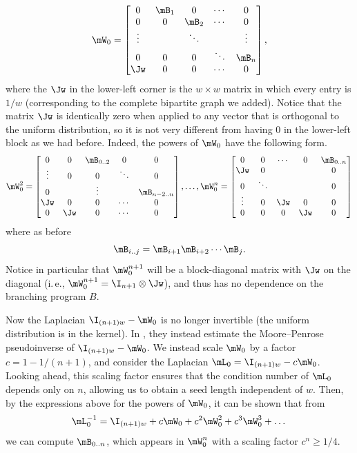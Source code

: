 \documentclass[11pt]{article}
\newcommand{\ie}{i.\,e.}
\begin{document}
    \begin{equation}
        \mW_0 =
    \begin{bmatrix}
    0 & \mB_1 & 0 & \cdots & 0 \\
    0 & 0 & \mB_2 & \cdots & 0 \\
    \vdots & & \ddots & & \vdots\\
    0 & 0 & 0 & \ddots & \mB_n\\
    \Jw & 0 & 0 & \cdots &  0 \\
    \end{bmatrix}, \label{eqn:bWhat}
    \end{equation}
    where the $\Jw$ in the lower-left corner is the $w\times w$ matrix in which every entry is $1/w$ (corresponding to the complete bipartite graph we added).  Notice that the matrix $\Jw$ is identically zero when applied to any vector that is orthogonal to the uniform distribution, so it is not very different %
    from having $0$ in the lower-left block as we had before. Indeed, the powers of $\mW_0$ have the following form. %
    \begin{equation} \label{eqn:bWhatpowers} 
    \mW_0^2 =
    \begin{bmatrix}
    0 & 0 & \mB_{0..2} & 0 & 0 \\
    \vdots & 0 & 0 & \ddots & 0 \\
    0 & & \vdots & & \mB_{n-2..n}\\
    \Jw & 0 & 0 & \cdots & 0\\
    0& \Jw & 0 & \cdots &  0 \\
    \end{bmatrix}, \ldots,
    \mW_0^n =
    \begin{bmatrix}
    0 & 0 & \cdots & 0 & \mB_{0..n} \\
    \Jw & 0 &  &  & 0 \\
    0 & \ddots &  & & 0\\
    \vdots & 0 & \Jw & 0 & 0\\
    0& 0 & 0 & \Jw &  0 \\
    \end{bmatrix}
    \end{equation}
    where as before 
    $$\mB_{i..j} = \mB_{i+1}\mB_{i+2}\cdots \mB_j.$$
    Notice in particular that $\mW_0^{n+1}$ will be a block-diagonal
    matrix with %
    $\Jw$ %
on the diagonal (\ie, $\mW_0^{n+1}=\I_{n+1}\otimes \Jw$), and thus has no dependence on the branching program $B$.
    
    Now the Laplacian $\I_{(n+1)w}-\mW_0$ is no longer invertible (the uniform distribution is in the kernel).  In \cite{AhmadinejadKeMuPeSiVa19}, they instead estimate the Moore--Penrose pseudoinverse of $\I_{(n+1)w}-\mW_0$. We instead scale $\mW_0$ by a factor $c=1-1/(n+1)$, and consider the Laplacian $\mL_0=\I_{(n+1)w}-c\mW_0$. Looking ahead, this scaling factor ensures that the condition number of $\mL_0$ depends only on $n$, allowing us to obtain a seed length independent of $w$. Then, by the expressions above for the powers of $\mW_0$, it can be shown that from
    $$\mL^{-1}_0 = \I_{(n+1)w}+c\mW_0+c^2\mW_0^2+c^3\mW_0^3+\dots$$
    we can compute $\mB_{0..n}$, which appears in $\mW_0^n$ with a scaling factor $c^n\geq 1/4$.
   
\end{document}
